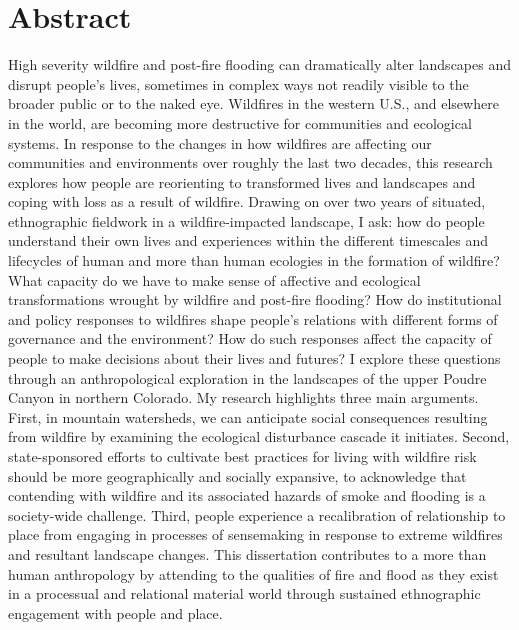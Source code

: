 \documentclass[
]{article}
\begin{document}
\clearpage

\setlength{\parindent}{4em} 
\linespread{1}
\doublespacing

\section*{Abstract}

High severity wildfire and post-fire flooding can dramatically alter landscapes and disrupt people's lives, sometimes in complex ways not readily visible to the broader public or to the naked eye. Wildfires in the western U.S., and elsewhere in the world, are becoming more destructive for communities and ecological systems. In response to the changes in how wildfires are affecting our communities and environments over roughly the last two decades, this research explores how people are reorienting to transformed lives and landscapes and coping with loss as a result of wildfire. Drawing on over two years of situated, ethnographic fieldwork in a wildfire-impacted landscape, I ask: how do people understand their own lives and experiences within the different timescales and lifecycles of human and more than human ecologies in the formation of wildfire? What capacity do we have to make sense of affective and ecological transformations wrought by wildfire and post-fire flooding? How do institutional and policy responses to wildfires shape people's relations with different forms of governance and the environment? How do such responses affect the capacity of people to make decisions about their lives and futures? I explore these questions through an anthropological exploration in the landscapes of the upper Poudre Canyon in northern Colorado. My research highlights three main arguments. First, in mountain watersheds, we can anticipate social consequences resulting from wildfire by examining the ecological disturbance cascade it initiates. Second, state-sponsored efforts to cultivate best practices for living with wildfire risk should be more geographically and socially expansive, to acknowledge that contending with wildfire and its associated hazards of smoke and flooding is a society-wide challenge. Third, people experience a recalibration of relationship to place from engaging in processes of sensemaking in response to extreme wildfires and resultant landscape changes. This dissertation contributes to a more than human anthropology by attending to the qualities of fire and flood as they exist in a processual and relational material world through sustained ethnographic engagement with people and place.
\end{document}
